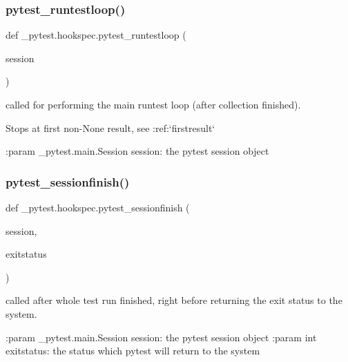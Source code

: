 \subsubsection{\texorpdfstring{pytest\+\_\+runtestloop()}{pytest\_runtestloop()}}
{\footnotesize\ttfamily def \+\_\+pytest.\+hookspec.\+pytest\+\_\+runtestloop (\begin{DoxyParamCaption}\item[{}]{session }\end{DoxyParamCaption})}

\begin{DoxyVerb}called for performing the main runtest loop
(after collection finished).

Stops at first non-None result, see :ref:`firstresult`

:param _pytest.main.Session session: the pytest session object
\end{DoxyVerb}
 \mbox{\label{namespace__pytest_1_1hookspec_af6e62afd7bc335947df1509e0e06b90a}} 
\subsubsection{\texorpdfstring{pytest\+\_\+sessionfinish()}{pytest\_sessionfinish()}}
{\footnotesize\ttfamily def \+\_\+pytest.\+hookspec.\+pytest\+\_\+sessionfinish (\begin{DoxyParamCaption}\item[{}]{session,  }\item[{}]{exitstatus }\end{DoxyParamCaption})}

\begin{DoxyVerb}called after whole test run finished, right before returning the exit status to the system.

:param _pytest.main.Session session: the pytest session object
:param int exitstatus: the status which pytest will return to the system
\end{DoxyVerb}
 \mbox{\label{namespace__pytest_1_1hookspec_ac68a946f4ca687e1cfd573fdd6517935}} 
